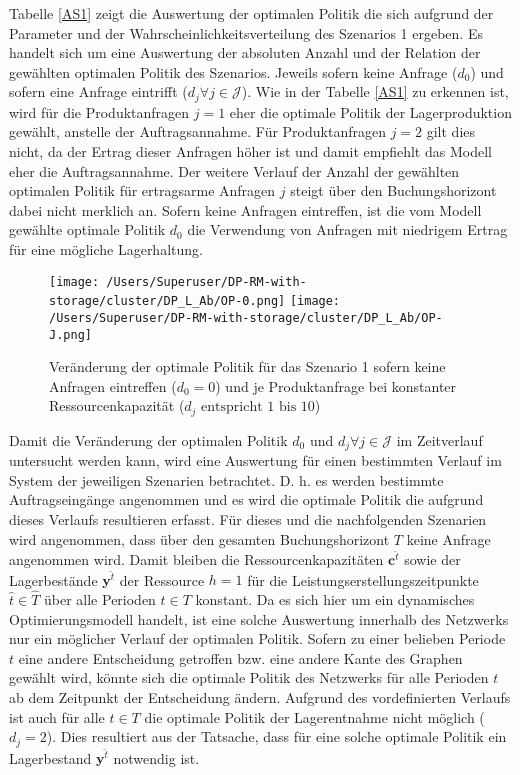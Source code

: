 Tabelle \ref{AS1} zeigt die Auswertung der optimalen Politik die sich aufgrund der Parameter und der Wahrscheinlichkeitsverteilung des Szenarios 1 ergeben. Es handelt sich um eine Auswertung der absoluten Anzahl und der Relation der gewählten optimalen Politik des Szenarios. Jeweils sofern keine Anfrage ($d_0$) und sofern eine Anfrage eintrifft ($d_j\forall j \in\mathcal{J}$). Wie in der Tabelle \ref{AS1} zu erkennen ist, wird für die Produktanfragen $j=1$ eher die optimale Politik der Lagerproduktion gewählt, anstelle der Auftragsannahme. Für Produktanfragen $j=2$ gilt dies nicht, da der Ertrag dieser Anfragen höher ist und damit empfiehlt das Modell eher die Auftragsannahme. Der weitere Verlauf der Anzahl der gewählten optimalen Politik für ertragsarme Anfragen $j$ steigt über den Buchungshorizont dabei nicht merklich an. Sofern keine Anfragen eintreffen, ist die vom Modell gewählte optimale Politik $d_{0}$ die Verwendung von Anfragen mit niedrigem Ertrag für eine mögliche Lagerhaltung.

\begin{figure}[h!]     
\begin{center}
\texttt{[image: /Users/Superuser/DP-RM-with-storage/cluster/DP\_L\_Ab/OP-0.png]}
\texttt{[image: /Users/Superuser/DP-RM-with-storage/cluster/DP\_L\_Ab/OP-J.png]}
    \caption{Veränderung der optimale Politik für das Szenario 1 sofern keine Anfragen eintreffen ($d_0=0$) und je Produktanfrage bei konstanter Ressourcenkapazität ($d_j\text{ entspricht }1\text{ bis }10$)}  \label{SV1}
  \end{center}
\end{figure}

Damit die Veränderung der optimalen Politik $d_0$ und $d_j \forall j \in \mathcal{J}$ im Zeitverlauf untersucht werden kann, wird eine Auswertung für einen bestimmten Verlauf im System der jeweiligen Szenarien betrachtet. D. h. es werden bestimmte Auftragseingänge angenommen und es wird die optimale Politik die aufgrund dieses Verlaufs resultieren erfasst. Für dieses und die nachfolgenden Szenarien wird angenommen, dass über den gesamten Buchungshorizont $T$ keine Anfrage angenommen wird. Damit bleiben die Ressourcenkapazitäten $\textbf{c}^{\hat t}$ sowie der Lagerbestände $\textbf{y}^{\hat t}$ der Ressource $h=1$ für die Leistungserstellungszeitpunkte $\hat t \in \hat T$ über alle Perioden $t\in T$ konstant. Da es sich hier um ein dynamisches Optimierungsmodell handelt, ist eine solche Auswertung innerhalb des Netzwerks nur ein möglicher Verlauf der optimalen Politik. Sofern zu einer belieben Periode $t$ eine andere Entscheidung getroffen bzw. eine andere Kante des Graphen gewählt wird, könnte sich die optimale Politik des Netzwerks für alle Perioden $t$ ab dem Zeitpunkt der Entscheidung ändern. Aufgrund des vordefinierten Verlaufs ist auch für alle $t \in T$ die optimale Politik der Lagerentnahme nicht möglich ($d_j=2$). Dies resultiert aus der Tatsache, dass für eine solche optimale Politik ein Lagerbestand $\textbf{y}^{\hat t}$ notwendig ist.

